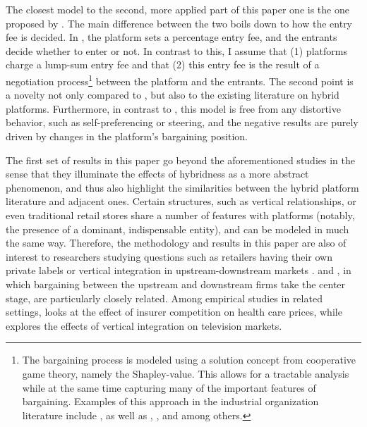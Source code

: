 \documentclass[a4paper]{article}
\begin{document}
The closest model to the second, more applied part of this paper one is the one proposed by \textcite{anderson2021hybrid}.
The main difference between the two boils down to how the entry fee is decided.
In \textcite{anderson2021hybrid}, the platform sets a percentage entry fee, and the entrants decide whether to enter or not.
In contrast to this, I assume that (1) platforms charge a lump-sum entry fee and that (2) this entry fee is the result of a negotiation process\footnote{
    The bargaining process is modeled using a solution concept from cooperative game theory, namely the Shapley-value.
    This allows for a tractable analysis while at the same time capturing many of the important features of bargaining.
    Examples of this approach in the industrial organization literature include \textcite{montez2007downstream}, as well as \textcite{hart1990property}, \textcite{levy1997individual}, \textcite{inderst2003bargaining} and \textcite{brugemann2019intra} among others.
}
between the platform and the entrants.
The second point is a novelty not only compared to \textcite{anderson2021hybrid}, but also to the existing literature on hybrid platforms.
Furthermore, in contrast to \textcite{hagiu2022should}, this model is free from any distortive behavior, such as self-preferencing or steering, and the negative results are purely driven by changes in the platform's bargaining position.

The first set of results in this paper go beyond the aforementioned studies in the sense that they illuminate the effects of hybridness as a more abstract phenomenon, and thus also highlight the similarities between the hybrid platform literature and adjacent ones.
Certain structures, such as vertical relationships, or even traditional retail stores share a number of features with platforms (notably, the presence of a dominant, indispensable entity), and can be modeled in much the same way.
Therefore, the methodology and results in this paper are also of interest to researchers studying questions such as retailers having their own private labels \parencite{steiner2004nature} or vertical integration in upstream-downstream markets \parencite{hart1990vertical,aghion2006vertical}.
\textcite{de2005vertical} and \textcite{montez2007downstream}, in which bargaining between the upstream and downstream firms take the center stage, are particularly closely related.
Among empirical studies in related settings, \textcite{ho2017insurer} looks at the effect of insurer competition on health care prices, while \textcite{crawford2018welfare} explores the effects of vertical integration on television markets.
\end{document}
